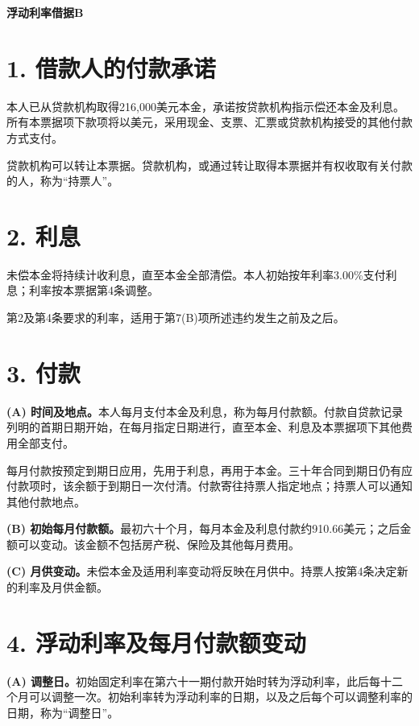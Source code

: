 \documentclass[UTF8,fontset=none,11pt,a4paper]{ctexart}
\begin{document}
{\noindent\fontsize{20}{25}\selectfont\bfseries 浮动利率借据B\par}
\vspace{10pt}
\section*{1. 借款人的付款承诺}
本人已从贷款机构取得216,000美元本金，承诺按贷款机构指示偿还本金及利息。所有本票据项下款项将以美元，采用现金、支票、汇票或贷款机构接受的其他付款方式支付。


贷款机构可以转让本票据。贷款机构，或通过转让取得本票据并有权收取有关付款的人，称为“持票人”。


\section*{2. 利息}
未偿本金将持续计收利息，直至本金全部清偿。本人初始按年利率3.00\%支付利息；利率按本票据第4条调整。


第2及第4条要求的利率，适用于第7(B)项所述违约发生之前及之后。


\section*{3. 付款}
\textbf{(A) 时间及地点。}本人每月支付本金及利息，称为每月付款额。付款自贷款记录列明的首期日期开始，在每月指定日期进行，直至本金、利息及本票据项下其他费用全部支付。


每月付款按预定到期日应用，先用于利息，再用于本金。三十年合同到期日仍有应付款项时，该余额于到期日一次付清。付款寄往持票人指定地点；持票人可以通知其他付款地点。


\textbf{(B) 初始每月付款额。}最初六十个月，每月本金及利息付款约910.66美元；之后金额可以变动。该金额不包括房产税、保险及其他每月费用。


\textbf{(C) 月供变动。}未偿本金及适用利率变动将反映在月供中。持票人按第4条决定新的利率及月供金额。


\section*{4. 浮动利率及每月付款额变动}
\textbf{(A) 调整日。}初始固定利率在第六十一期付款开始时转为浮动利率，此后每十二个月可以调整一次。初始利率转为浮动利率的日期，以及之后每个可以调整利率的日期，称为“调整日”。
\end{document}
